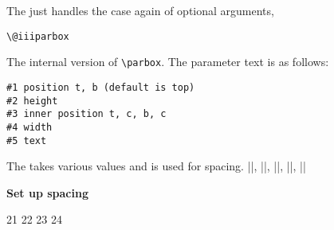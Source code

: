 The  just handles the case again of optional arguments,

\begin{teX}
\def\@iparbox[#1]{%
   \@ifnextchar[%
   {\@iiparbox{#1}}%
   {\@iiiparbox{#1}\relax[s]}}
\end{teX}


  

\begin{teX}
\def\@iiparbox#1[#2]{%
   \@ifnextchar[%
   {\@iiiparbox{#1}{#2}}%
   {\@iiiparbox{#1}{#2}[#1]}}
\end{teX}

\begin{teX}
   \let\@parboxto\@empty
\end{teX}

\hspace{-1cm}\texttt{\textbackslash @iiiparbox}

The internal version of \texttt{\textbackslash parbox}. The parameter text is as follows:

\begin{verbatim}
#1 position t, b (default is top)
#2 height
#3 inner position t, c, b, c
#4 width
#5 text
\end{verbatim}

\begin{teX}
  \long{}
\end{teX}

\noindent The  takes various values and is used for spacing. 
|\bm@l|, |\bm@r|, |\bm@s|, |\bm@t|, |\bm@b|


\textbf{Set up spacing}

\begin{teXX}
21 \def\bm@c{\hss\unhbox\@tempboxa\hss}
22 \def\bm@l{\unhbox\@tempboxa\hss}\let\bm@t\bm@l
23 \def\bm@r{\hss\unhbox\@tempboxa}\let\bm@b\bm@r
24 \def\bm@s{\unhbox\@tempboxa}
\end{teXX}


